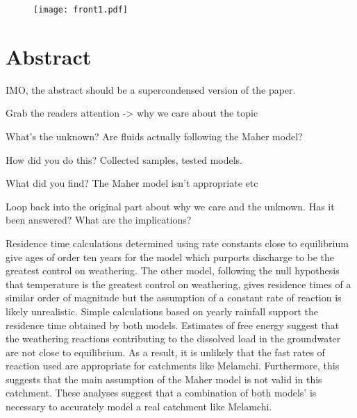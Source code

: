 \documentclass[hidelinks, 12pt]{article} %
\title{
  \vspace{-1cm}
  {\fontsize{16pt}{18pt}\selectfont
    \textbf{
      \strut Ground Truthing Earth's Silicate Weathering Thermostat:\\[0.4em] %
      \strut Using the Geochemistry of Himalayan Groundwaters to \\[-0.2em]
      \strut Calculate Residence Times
    }
  }
  \vspace{0.5cm}
}
\author{Giovanni Bernardi\\ 
Part III Project}
\date{2024-2025}
\newcommand{\bsk}{\vspace{\baselineskip}}
\begin{document}

\maketitle

\begingroup
\renewcommand{\thefigure}{} %
\begin{figure}[h]
  \centering
      \texttt{[image: front1.pdf]}
\end{figure}
\endgroup


\thispagestyle{empty}

\newpage

\section*{Abstract}
\label{sec:abstract}

IMO, the abstract should be a supercondensed version of the paper.

Grab the readers attention -> why we care about the topic

What's the unknown? Are fluids actually following the Maher model?

How did you do this? Collected samples, tested models.

What did you find? The Maher model isn't appropriate etc

Loop back into the original part about why we care and the unknown. Has it been answered? What are the implications?

\bsk

Residence time calculations determined using rate constants close to equilibrium give ages of order ten years for the model which purports discharge to be the greatest control on weathering. The other model, following the null hypothesis that temperature is the greatest control on weathering, gives residence times of a similar order of magnitude but the assumption of a constant rate of reaction is likely unrealistic. Simple calculations based on yearly rainfall support the residence time obtained by both models. Estimates of free energy suggest that the weathering reactions contributing to the dissolved load in the groundwater are not close to equilibrium. As a result, it is unlikely that the fast rates of reaction used are appropriate for catchments like Melamchi. Furthermore, this suggests that the main assumption of the Maher model is not valid in this catchment. These analyses suggest that a combination of both models' is necessary to accurately model a real catchment like Melamchi.
\end{document}
